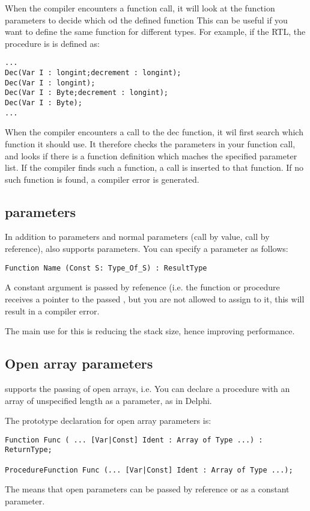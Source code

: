\documentclass{report}
\begin{document}
When the compiler encounters a function call, it will look at the function
parameters to decide which od the defined function
This can be useful if you want to define the same function for different
types. For example, if the RTL, the   procedure is
is defined as:
\begin{verbatim}
...
Dec(Var I : longint;decrement : longint);
Dec(Var I : longint);
Dec(Var I : Byte;decrement : longint);
Dec(Var I : Byte);
...
\end{verbatim}
When the compiler encounters a call to the dec function, it wil first search
which function it should use. It therefore checks the parameters in your
function call, and looks if there is a function definition which maches the
specified parameter list. If the compiler finds such a function, a call is
inserted to that function. If no such function is found, a compiler error is
generated.

\subsection{ parameters}
In addition to  parameters and normal parameters (call by value,
call by reference), \fpc also supports  parameters. You can
specify a  parameter as follows:
\begin{verbatim}
Function Name (Const S: Type_Of_S) : ResultType
\end{verbatim}
A constant argument is passed by refenence 
(i.e. the function or procedure receives a pointer to the passed , 
but you are not allowed to assign to it, this will result in a compiler error.

The main use for this is reducing the stack size, hence improving
performance.

\subsection{Open array parameters}
\fpc supports the passing of open arrays, i.e. You can declare a procedure
with an array of unspecified length as a parameter, as in Delphi.

The prototype declaration for open array parameters is:
\begin{verbatim}
Function Func ( ... [Var|Const] Ident : Array of Type ...) : ReturnType;

ProcedureFunction Func (... [Var|Const] Ident : Array of Type ...);
\end{verbatim}
The  means that open parameters can be passed by reference
or as a constant parameter.
\end{document}
